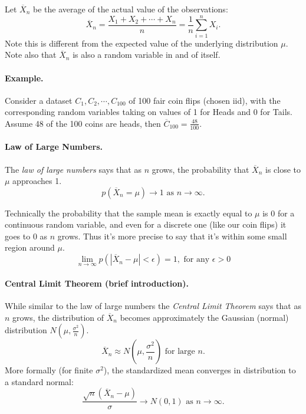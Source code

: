 Let $\overline{X}_n$ be the average of the actual value of the observations:
\[\overline{X}_n = \frac{X_1 + X_2 + \cdots + X_n}{n} = \frac{1}{n} \sum_{i=1}^n X_i.\]
Note this is different from the expected value of the underlying distribution $\mu$.
Note also that $\overline{X}_n$ is also a random variable in and of itself. 

\paragraph{Example. }
Consider a dataset $C_1, C_2,\cdots,C_{100}$ of 100 fair coin flips (chosen iid), with the corresponding random variables 
taking on values of 1 for Heads and 0 for Tails. 
Assume 48 of the 100 coins are heads, then $\overline{C}_{100} = \frac{48}{100}$. 


\paragraph{Law of Large Numbers.} The \emph{law of large numbers} says that as $n$ grows, the probability that $\overline{X}_n$ is close to $\mu$ approaches 1. 
\[p\left(\overline{X}_n=\mu\right) \to 1 \text{ as } n\rightarrow\infty.\]

\begin{aside}
Technically the probability that the sample mean is exactly equal to $\mu$ is 0 for a continuous random variable, 
and even for a discrete one (like our coin flips) it goes to 0 as $n$ grows.
Thus it's more precise to say that it's within some small region around $\mu$. 
\[\lim_{n\rightarrow\infty} p(|\overline{X}_n-\mu| < \epsilon) = 1, \text{ for any } \epsilon > 0\]
\end{aside}

\paragraph{Central Limit Theorem (brief introduction).} While similar to the law of large numbers the \emph{Central Limit Theorem} says that as $n$ grows, 
the distribution of $\overline{X}_n$ becomes approximately the Gaussian (normal) distribution $N\left(\mu, \frac{\sigma^2}{n}\right)$. 
\[\overline{X}_n \approx N\left(\mu, \frac{\sigma^2}{n}\right) \text{ for large } n.\]
More formally (for finite $\sigma^2$), the standardized mean converges in distribution to a standard normal:
\[\frac{\sqrt{n}\left(\overline{X}_n-\mu\right)}{\sigma} \to N(0,1) \text{ as } n\rightarrow\infty.\]


